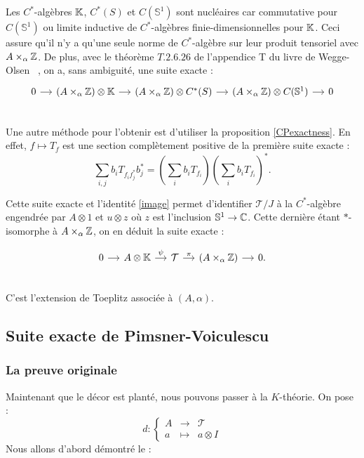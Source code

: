 Les $C^*$-algèbres $\mathbb K$, $C^*(S)$ et $C(\mathbb S^1)$ sont nucléaires car commutative pour $C(\mathbb S^1)$ ou limite inductive de $C^*$-algèbres finie-dimensionnelles pour $\mathbb K$. %
Ceci assure qu'il n'y a qu'une seule norme de  $C^*$-algèbre sur leur produit tensoriel avec $A\times _\alpha \mathbb Z$. De plus, avec le théorème $T.2.6.26$ de l'appendice T du livre de Wegge-Olsen ~\cite{WeggeOlsen}, on a, sans ambiguité, une suite exacte :
\[\begin{tikzcd}[column sep=small]
0 \arrow{r} & (A\times _\alpha \Z)\otimes \K \arrow{r} &  (A\times _\alpha \Z)\otimes C^*(S) \arrow{r}  &  (A\times _\alpha \Z) \otimes C(\mathbb S^1) \arrow{r} & 0 \\ 
\end{tikzcd}\] 
Une autre méthode pour l'obtenir est d'utiliser la proposition \ref{CPexactness}. En effet, $f\mapsto T_f$ est une section complètement positive de la première suite exacte :
\[\sum_{i,j} b_i T_{f_i f_j^*} b_j^*= (\sum_i b_i T_{f_i})(\sum_i b_i T_{f_i})^*.\]

Cette suite exacte et l'identité \ref{image} permet d'identifier $\mathcal T / J$ à la $C^*$-algèbre engendrée par $A\otimes 1$ et $u\otimes z$ où $z$ est l'inclusion $\mathbb S^1 \rightarrow \mathbb C$. Cette dernière étant $*$-isomorphe à $A\times_\alpha \mathbb Z$, on en déduit la suite exacte :

\[\begin{tikzcd}[column sep=small]
0 \arrow{r} &  A\otimes \K \arrow{r}{\psi} &  \mathcal T \arrow{r}{\pi}  &  (A\times _\alpha \Z) \arrow{r} & 0. \\ 
\end{tikzcd}\] 
C'est l'extension de Toeplitz associée à $(A,\alpha)$.
\subsection{Suite exacte de Pimsner-Voiculescu}
\subsubsection{La preuve originale}

Maintenant que le décor est planté, nous pouvons passer à la $K$-théorie. 
On pose :  \[d : \left\{\begin{array}{rcl}A & \rightarrow & \mathcal T \\ a & \mapsto & a\otimes I\end{array}\right.\]
Nous allons d'abord démontré le :

